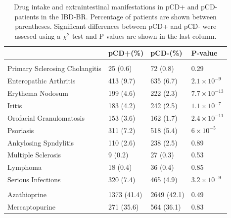 \begin{table}
  \centering
  \caption[Drug intake and extraintestinal manifestations in IBD-BR]{Drug intake and extraintestinal manifestations in pCD+ and pCD- patients in the IBD-BR. Percentage of patients are shown between parentheses. Significant differences between pCD+ and pCD- were assesed using a $\chi^{2}$ test and P-values are shown in the last column.}
  \label{table:drug_eim}
  \begin{tabular}[t]{llll}
  \toprule
  \textbf{} & \textbf{pCD+(\%)} & \textbf{pCD-(\%)} & \textbf{P-value}\\
  \midrule
  \addlinespace[0.3em]
  \multicolumn{4}{l}{\textbf{Extraintestinal Manifestations}}\\
  \hspace{1em}Primary Sclerosing Cholangitis & 25 (0.6) & 72 (0.8) & 0.29\\
  \hspace{1em}Enteropathic Arthritis & 413 (9.7) & 635 (6.7) & $2.1\times10^{-9}$\\
  \hspace{1em}Erythema Nodosum & 199 (4.6) & 222 (2.3) & $7.7\times10^{-13}$\\
  \hspace{1em}Iritis & 183 (4.2) & 242 (2.5) & $1.1\times10^{-7}$\\
  \hspace{1em}Orofacial Granulomatosis & 153 (3.6) & 162 (1.7) & $2.4\times10^{-11}$\\
  \hspace{1em}Psoriasis & 311 (7.2) & 518 (5.4) & $6\times10^{-5}$\\
  \hspace{1em}Ankylosing Spndylitis & 110 (2.6) & 238 (2.5) & 0.89\\
  \hspace{1em}Multiple Sclerosis & 9 (0.2) & 27 (0.3) & 0.53\\
  \hspace{1em}Lymphoma & 18 (0.4) & 36 (0.4) & 0.85\\
  \hspace{1em}Serious Infections & 320 (7.4) & 465 (4.9) & $3.2\times10^{-9}$\\
  \addlinespace[0.3em]
  \multicolumn{4}{l}{\textbf{Drugs}}\\
  \hspace{1em}Azathioprine & 1373 (41.4) & 2649 (42.1) & 0.49\\
  \hspace{1em}Mercaptopurine & 271 (35.6) & 564 (36.1) & 0.83\\

\end{tabular}
\end{table}
